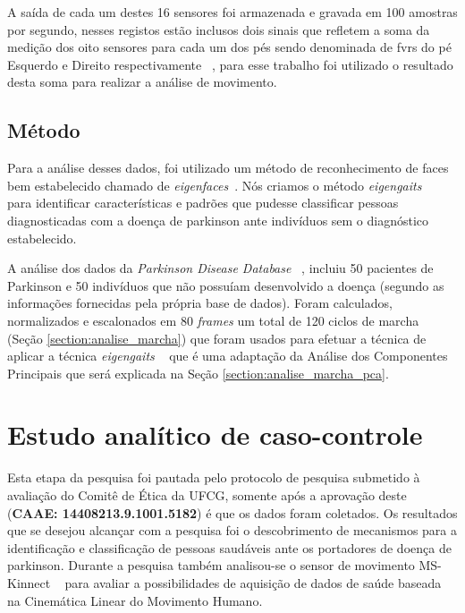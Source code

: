 A saída de cada um destes 16 sensores foi armazenada e gravada em 100 amostras por segundo, nesses registos estão inclusos dois sinais que refletem a soma da medição dos oito sensores para cada um dos pés sendo denominada de \ac{fvrs} do pé Esquerdo e Direito respectivamente ~\cite{gaitusingsensorsreview2012}, para esse trabalho foi utilizado o resultado desta soma para realizar a análise de movimento.

\subsection{Método}\label{section:metodo_parkinson_database}
Para a análise desses dados, foi utilizado um método de reconhecimento de faces bem estabelecido chamado de \textit{eigenfaces}~\cite{eigenfaces91}. Nós criamos o  método \textit{eigengaits} ~\cite{medeiros2013} para identificar características e padrões que pudesse classificar pessoas diagnosticadas com a doença de parkinson ante indivíduos sem o diagnóstico estabelecido.

A análise dos dados da \textit{Parkinson Disease Database} ~\cite{physionet}, incluiu 50 pacientes de Parkinson e 50 indivíduos que não possuíam desenvolvido a doença (segundo as informações fornecidas pela própria base de dados). Foram calculados, normalizados e escalonados em 80 \textit{frames} um total de 120 ciclos de marcha (Seção \ref{section:analise_marcha}) que foram usados para efetuar a técnica de aplicar a técnica \textit{eigengaits} ~\cite{medeiros2013} que é uma adaptação da Análise dos Componentes Principais que será explicada na Seção \ref{section:analise_marcha_pca}. 


\section{Estudo analítico de caso-controle}\label{section:estudo_caso_controle}
Esta etapa da pesquisa foi pautada pelo protocolo de pesquisa submetido à avaliação do Comitê de Ética da UFCG, somente após a aprovação deste (\textbf{CAAE: 14408213.9.1001.5182}) é que os dados foram coletados. 
Os resultados que se desejou alcançar com a pesquisa foi o descobrimento de mecanismos para a identificação e classificação de pessoas saudáveis ante os portadores de doença de parkinson. Durante a pesquisa também analisou-se o sensor de movimento MS-Kinnect ~\cite{kinnect2013} para avaliar a possibilidades de aquisição de dados de saúde baseada na Cinemática Linear do Movimento Humano.  

